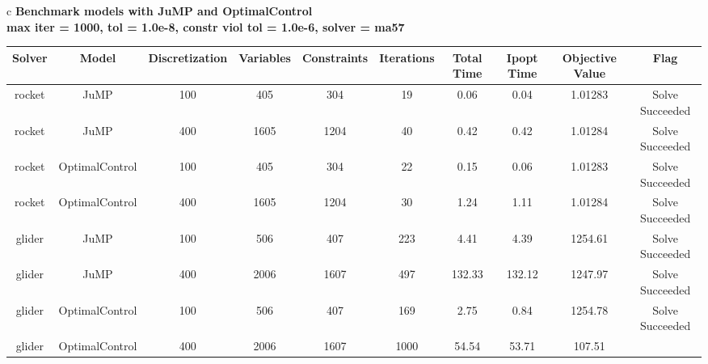 \documentclass{standalone}
\begin{document}
\begin{tabular}{c}
\Large\textbf{Benchmark models with JuMP and OptimalControl}\\
\large\textbf{max iter = 1000, tol = 1.0e-8, constr viol tol = 1.0e-6, solver = ma57}\\
\begin{tabular}{cccccccccc}
  \hline
  \textbf{Solver} & \textbf{Model} & \textbf{Discretization} & \textbf{Variables} & \textbf{Constraints} & \textbf{Iterations} & \textbf{Total Time} & \textbf{Ipopt Time} & \textbf{Objective Value} & \textbf{Flag} \\\hline
  rocket & JuMP & 100 & 405 & 304 & 19 & 0.06 & 0.04 & 1.01283 & Solve Succeeded \\
  rocket & JuMP & 400 & 1605 & 1204 & 40 & 0.42 & 0.42 & 1.01284 & Solve Succeeded \\
  rocket & OptimalControl & 100 & 405 & 304 & 22 & 0.15 & 0.06 & 1.01283 & Solve Succeeded \\
  rocket & OptimalControl & 400 & 1605 & 1204 & 30 & 1.24 & 1.11 & 1.01284 & Solve Succeeded \\
  glider & JuMP & 100 & 506 & 407 & 223 & 4.41 & 4.39 & 1254.61 & Solve Succeeded \\
  glider & JuMP & 400 & 2006 & 1607 & 497 & 132.33 & 132.12 & 1247.97 & Solve Succeeded \\
  glider & OptimalControl & 100 & 506 & 407 & 169 & 2.75 & 0.84 & 1254.78 & Solve Succeeded \\
  glider & OptimalControl & 400 & 2006 & 1607 & 1000 & 54.54 & 53.71 & 107.51 & \color{red}{Iterations Exceeded} \\\hline
\end{tabular}
\end{tabular}
\end{document}
